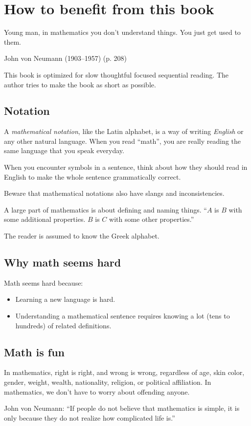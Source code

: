 \chapter{How to benefit from this book}

\epigraph{Young man, in mathematics you don't understand things. You just get used to them.}{John von Neumann (1903--1957) \cite{zukav1979dancing} (p. 208)}

This book is optimized for slow thoughtful focused sequential reading.
The author tries to make the book as short as possible.

\section{Notation}

A \emph{mathematical notation}, like the Latin alphabet,
is a way of writing \emph{English} or any other natural language.
When you read ``math'',
you are really reading the same language
that you speak everyday.

When you encounter symbols in a sentence,
think about how they should read in English
to make the whole sentence grammatically correct.

Beware that mathematical notations also have slangs and inconsistencies.

A large part of mathematics is about defining and naming things.
``\(A\) is \(B\) with some additional properties. \(B\) is \(C\) with some other properties.''

The reader is assumed to know the Greek alphabet.

\section{Why math seems hard}

Math seems hard because:
\begin{itemize}
    \item
        Learning a new language is hard.
    \item
        Understanding a mathematical sentence
        requires knowing a lot (tens to hundreds) of related definitions.
\end{itemize}

\section{Math is fun}

In mathematics, right is right, and wrong is wrong,
regardless of age, skin color, gender, weight, wealth,
nationality, religion, or political affiliation.
In mathematics, we don't have to worry about offending anyone.

John von Neumann:
``If people do not believe that mathematics is simple, it is only because they do not realize how complicated life is.''
